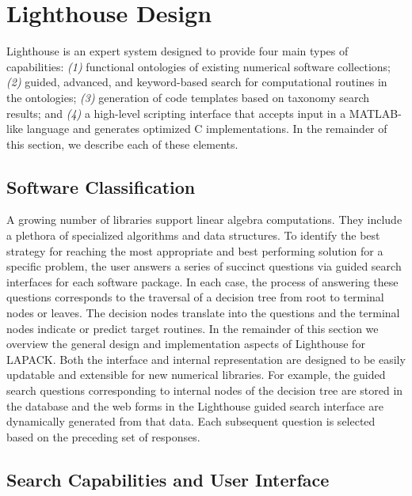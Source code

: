 \documentclass{sig-alternate}
\begin{document}
\newpage
\section{Lighthouse Design}
\label{sec:method}


Lighthouse is an expert system designed to provide four main types of capabilities:
\textit{(1)} functional ontologies of existing numerical software collections;
\textit{(2)} guided, advanced, and keyword-based search for computational routines in the ontologies; 
\textit{(3)} generation of code templates based on taxonomy search results; and
\textit{(4)} a high-level scripting interface that accepts input in a MATLAB-like language and generates optimized C implementations. 
In the remainder of this section, we describe each of these elements.

\subsection{Software Classification}


A growing number of libraries support linear algebra computations. They include a plethora of specialized 
algorithms and data structures. To identify the best strategy for reaching the most appropriate and best 
performing solution for a specific problem, the user answers a series of
succinct questions via guided search interfaces for each software package. 
In each case, the process of answering these questions corresponds to the traversal of a decision
tree from root to terminal nodes or leaves.  The decision nodes translate into the questions
and the terminal nodes indicate or predict target routines. 
In the remainder of this section we overview the general design and implementation aspects of Lighthouse
for LAPACK.
Both the interface and internal 
representation are designed
to be easily updatable and extensible for new numerical libraries. For example, 
the guided search questions corresponding to internal 
nodes of the decision tree are stored in the database and the web forms in the Lighthouse guided search 
interface are 
dynamically generated from that data. Each subsequent question is selected based on the preceding set of 
responses.






\subsection{Search Capabilities and User Interface}
\end{document}
